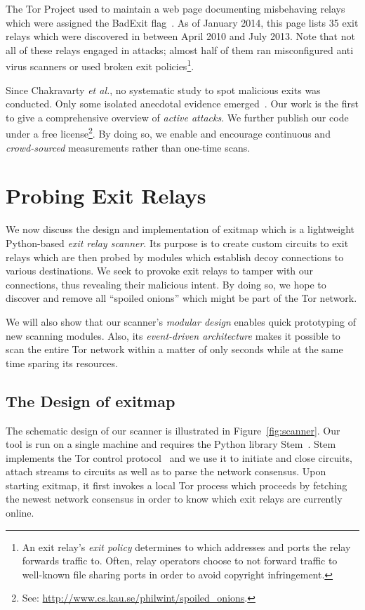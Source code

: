 \documentclass[letterpaper,twocolumn,10pt]{article}
\begin{document}
The Tor Project used to maintain a web page documenting misbehaving relays which were assigned the
BadExit flag~\cite{badexits}.  As of January 2014, this page lists 35 exit relays which were
discovered in between April 2010 and July 2013.  Note that not all of these relays engaged in
attacks; almost half of them ran misconfigured anti virus scanners or used broken exit
policies\footnote{An exit relay's \emph{exit policy} determines to which addresses and ports the
relay forwards traffic to.  Often, relay operators choose to not forward traffic to well-known file
sharing ports in order to avoid copyright infringement.}.

Since Chakravarty \emph{et al.}, no systematic study to spot malicious exits was conducted.  Only
some isolated anecdotal evidence emerged~\cite{furry}.  Our work is the first to give a
comprehensive overview of \emph{active attacks}.  We further publish our code under a free
license\footnote{See: \url{http://www.cs.kau.se/philwint/spoiled_onions}.}.  By doing so, we enable and
encourage continuous and \emph{crowd-sourced} measurements rather than one-time scans.

\section{Probing Exit Relays}
\label{sec:scanning}
We now discuss the design and implementation of \textsf{exitmap} which is a lightweight Python-based
\emph{exit relay scanner}.  Its purpose is to create custom circuits to exit relays which are then
probed by modules which establish decoy connections to various destinations.  We seek to provoke
exit relays to tamper with our connections, thus revealing their malicious intent.  By doing so, we
hope to discover and remove all ``spoiled onions'' which might be part of the Tor network.

We will also show that our scanner's \emph{modular design} enables quick prototyping of new scanning
modules.  Also, its \emph{event-driven architecture} makes it possible to scan the entire Tor
network within a matter of only seconds while at the same time sparing its resources.

\subsection{The Design of \textsf{exitmap}}
\label{sec:scanner}
The schematic design of our scanner is illustrated in Figure~\ref{fig:scanner}.  Our tool is run on
a single machine and requires the Python library \textsf{Stem}~\cite{stem}.  \textsf{Stem}
implements the Tor control protocol~\cite{torcontrol} and we use it to initiate and close circuits,
attach streams to circuits as well as to parse the network consensus.  Upon starting
\textsf{exitmap}, it first invokes a local Tor process which proceeds by fetching the newest network
consensus in order to know which exit relays are currently online.
\end{document}
